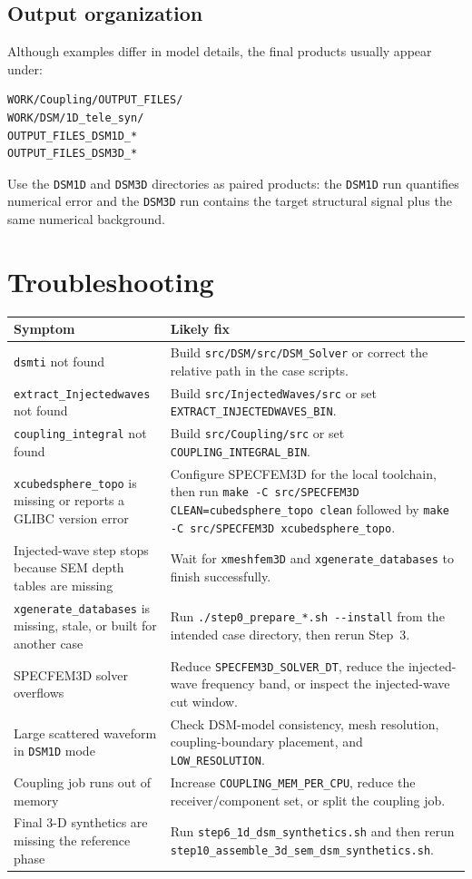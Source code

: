 \documentclass[11pt,oneside]{book}
\DeclareRobustCommand{\code}[1]{\nolinkurl{#1}}
\begin{document}
\section{Output organization}

Although examples differ in model details, the final products usually appear
under:
\begin{lstlisting}
WORK/Coupling/OUTPUT_FILES/
WORK/DSM/1D_tele_syn/
OUTPUT_FILES_DSM1D_*
OUTPUT_FILES_DSM3D_*
\end{lstlisting}
Use the \code{DSM1D} and \code{DSM3D} directories as paired products: the
\code{DSM1D} run quantifies numerical error and the \code{DSM3D} run contains
the target structural signal plus the same numerical background.

\backmatter
\chapter{Troubleshooting}

\begin{longtable}{L{0.32\textwidth}L{0.58\textwidth}}
\toprule
Symptom & Likely fix \\
\midrule
\code{dsmti} not found & Build \code{src/DSM/src/DSM_Solver} or correct the
relative path in the case scripts. \\
\code{extract_Injectedwaves} not found & Build \code{src/InjectedWaves/src}
or set \code{EXTRACT_INJECTEDWAVES_BIN}. \\
\code{coupling_integral} not found & Build \code{src/Coupling/src} or set
\code{COUPLING_INTEGRAL_BIN}. \\
\code{xcubedsphere_topo} is missing or reports a GLIBC version error &
Configure SPECFEM3D for the local toolchain, then run
\code{make -C src/SPECFEM3D CLEAN=cubedsphere_topo clean} followed by
\code{make -C src/SPECFEM3D xcubedsphere_topo}. \\
Injected-wave step stops because SEM depth tables are missing & Wait for
\code{xmeshfem3D} and \code{xgenerate_databases} to finish successfully. \\
\code{xgenerate_databases} is missing, stale, or built for another case & Run
\code{./step0_prepare_*.sh --install} from the intended case directory, then
rerun Step~3. \\
SPECFEM3D solver overflows & Reduce \code{SPECFEM3D_SOLVER_DT}, reduce the
injected-wave frequency band, or inspect the injected-wave cut window. \\
Large scattered waveform in \code{DSM1D} mode & Check DSM-model consistency,
mesh resolution, coupling-boundary placement, and \code{LOW_RESOLUTION}. \\
Coupling job runs out of memory & Increase \code{COUPLING_MEM_PER_CPU}, reduce
the receiver/component set, or split the coupling job. \\
Final 3-D synthetics are missing the reference phase & Run
\code{step6_1d_dsm_synthetics.sh} and then rerun
\code{step10_assemble_3d_sem_dsm_synthetics.sh}. \\
\bottomrule
\end{longtable}
\end{document}
